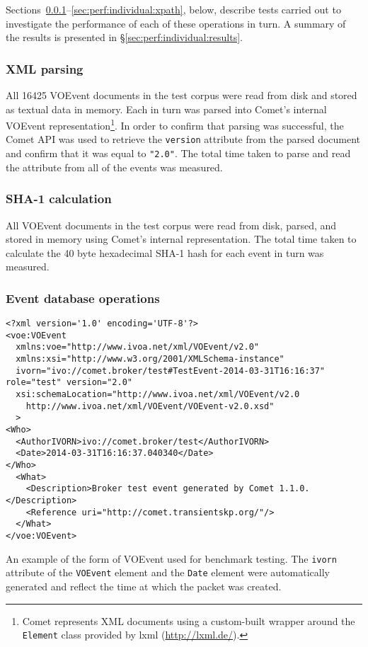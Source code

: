 \documentclass[5p,authoryear]{elsarticle}
\begin{document}
Sections~\ref{sec:perf:individual:parse}--\ref{sec:perf:individual:xpath},
below, describe tests carried out to investigate the performance of each of
these operations in turn. A summary of the results is presented in
\S\ref{sec:perf:individual:results}.

\subsubsection{XML parsing}
\label{sec:perf:individual:parse}

All 16425 VOEvent documents in the test corpus were read from disk and stored
as textual data in memory. Each in turn was parsed into Comet's internal
VOEvent representation\footnote{Comet represents XML documents using a
custom-built wrapper around the \texttt{Element} class provided by lxml
(\url{http://lxml.de/}).}. In order to confirm that parsing was successful,
the Comet API was used to retrieve the \texttt{version} attribute from the
parsed document and confirm that it was equal to \texttt{"2.0"}. The total
time taken to parse and read the attribute from all of the events was
measured.

\subsubsection{SHA-1 calculation}
\label{sec:perf:individual:hash}

All VOEvent documents in the test corpus were read from disk, parsed, and
stored in memory using Comet's internal representation. The total time taken
to calculate the 40 byte hexadecimal SHA-1 hash for each event in turn was
measured.

\subsubsection{Event database operations}

\begin{listing*}
\begin{verbatim}
<?xml version='1.0' encoding='UTF-8'?>
<voe:VOEvent
  xmlns:voe="http://www.ivoa.net/xml/VOEvent/v2.0"
  xmlns:xsi="http://www.w3.org/2001/XMLSchema-instance"
  ivorn="ivo://comet.broker/test#TestEvent-2014-03-31T16:16:37" role="test" version="2.0"
  xsi:schemaLocation="http://www.ivoa.net/xml/VOEvent/v2.0
    http://www.ivoa.net/xml/VOEvent/VOEvent-v2.0.xsd"
  >
<Who>
  <AuthorIVORN>ivo://comet.broker/test</AuthorIVORN>
  <Date>2014-03-31T16:16:37.040340</Date>
</Who>
  <What>
    <Description>Broker test event generated by Comet 1.1.0.</Description>
    <Reference uri="http://comet.transientskp.org/"/>
  </What>
</voe:VOEvent>
\end{verbatim}
\caption{An example of the form of VOEvent used for benchmark testing. The
\texttt{ivorn} attribute of the \texttt{VOEvent} element and the \texttt{Date}
element were automatically generated and reflect the time at which the packet
was created.}
\label{lst:testmessage}
\end{listing*}
\end{document}
